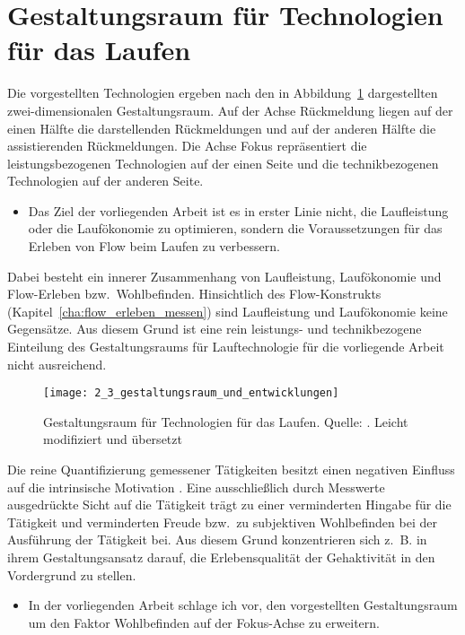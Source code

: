 

\section{Gestaltungsraum für Technologien für das Laufen} 

\label{sec:gestaltungsraum_fur_technologien_fur_das_laufen}

Die vorgestellten Technologien ergeben nach \citet[][]{Jensen2014} den in Abbildung~\ref{fig:2_3_gestaltungsraum_und_entwicklungen} dargestellten zwei-dimensionalen Gestaltungsraum. Auf der Achse Rückmeldung liegen auf der einen Hälfte die darstellenden Rückmeldungen und auf der anderen Hälfte die assistierenden Rückmeldungen. Die Achse Fokus repräsentiert die leistungsbezogenen Technologien auf der einen Seite und die technikbezogenen Technologien auf der anderen Seite.
\begin{itemize}
	
	\item Das Ziel der vorliegenden Arbeit ist es in erster Linie nicht, die Laufleistung oder die Laufökonomie zu optimieren, sondern die Voraussetzungen für das Erleben von Flow beim Laufen zu verbessern.
\end{itemize}

Dabei besteht ein innerer Zusammenhang von Laufleistung, Laufökonomie und Flow-Erleben bzw.\ Wohlbefinden. Hinsichtlich des Flow-Konstrukts (Kapitel~\ref{cha:flow_erleben_messen}) sind Laufleistung und Laufökonomie keine Gegensätze. Aus diesem Grund ist eine rein leistungs- und technikbezogene Einteilung des Gestaltungsraums für Lauftechnologie für die vorliegende Arbeit nicht ausreichend.
\begin{figure}
	[ht] \centering 
	\texttt{[image: 2\_3\_gestaltungsraum\_und\_entwicklungen]} \caption[Gestaltungsraum für Technologien für das Laufen]{Gestaltungsraum für Technologien für das Laufen. Quelle: \citet[][]{Jensen2014}. Leicht modifiziert und übersetzt}\label{fig:2_3_gestaltungsraum_und_entwicklungen} 
\end{figure}

Die reine Quantifizierung gemessener Tätigkeiten besitzt einen negativen Einfluss auf die intrinsische Motivation \citep[][]{Etkin2016}. Eine ausschließlich durch Messwerte ausgedrückte Sicht auf die Tätigkeit trägt zu einer verminderten Hingabe für die Tätigkeit und verminderten Freude bzw.\ zu subjektiven Wohlbefinden bei der Ausführung der Tätigkeit bei. Aus diesem Grund konzentrieren sich z.~B. \citet{Hajinejad2015} in ihrem Gestaltungsansatz darauf, die Erlebensqualität der Gehaktivität in den Vordergrund zu stellen.
\begin{itemize}
	
	\item In der vorliegenden Arbeit schlage ich vor, den vorgestellten Gestaltungsraum um den Faktor Wohlbefinden auf der Fokus-Achse zu erweitern.
\end{itemize}

